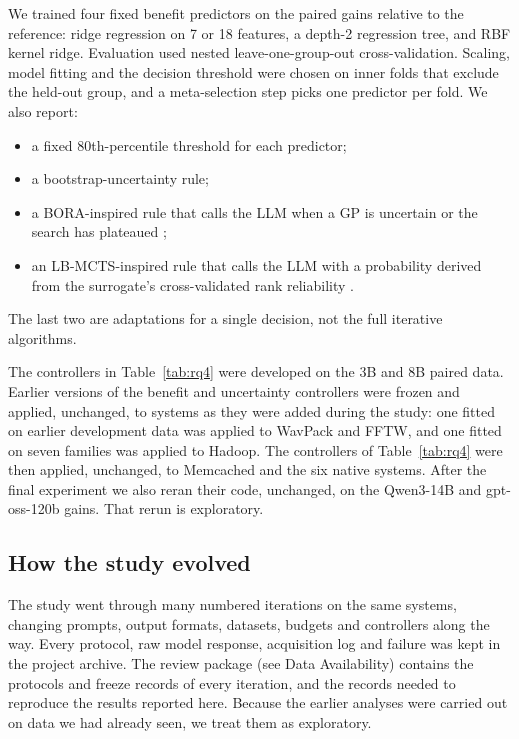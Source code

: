 We trained four fixed benefit predictors on the paired gains relative to the reference: ridge regression on 7 or 18 features, a depth-2 regression tree, and RBF kernel ridge. Evaluation used nested leave-one-group-out cross-validation. Scaling, model fitting and the decision threshold were chosen on inner folds that exclude the held-out group, and a meta-selection step picks one predictor per fold. We also report:
\begin{itemize}
  \item a fixed 80th-percentile threshold for each predictor;
  \item a bootstrap-uncertainty rule;
  \item a BORA-inspired rule that calls the LLM when a GP is uncertain or the search has plateaued \cite{cisse2025bora};
  \item an LB-MCTS-inspired rule that calls the LLM with a probability derived from the surrogate's cross-validated rank reliability \cite{xu2026lbmcts}.
\end{itemize}
The last two are adaptations for a single decision, not the full iterative algorithms.

The controllers in Table~\ref{tab:rq4} were developed on the 3B and 8B paired data. Earlier versions of the benefit and uncertainty controllers were frozen and applied, unchanged, to systems as they were added during the study: one fitted on earlier development data was applied to WavPack and FFTW, and one fitted on seven families was applied to Hadoop. The controllers of Table~\ref{tab:rq4} were then applied, unchanged, to Memcached and the six native systems. After the final experiment we also reran their code, unchanged, on the Qwen3-14B and gpt-oss-120b gains. That rerun is exploratory.

\subsection{How the study evolved}
\label{sec:history}

The study went through many numbered iterations on the same systems, changing prompts, output formats, datasets, budgets and controllers along the way. Every protocol, raw model response, acquisition log and failure was kept in the project archive. The review package (see Data Availability) contains the protocols and freeze records of every iteration, and the records needed to reproduce the results reported here. Because the earlier analyses were carried out on data we had already seen, we treat them as exploratory.

